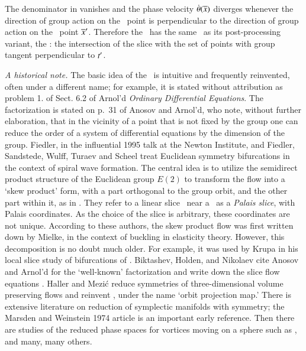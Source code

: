 \documentclass[preprint,number,sort&compress]{elsarticle}
\begin{document}
The denominator in  vanishes and the phase
velocity $\dot{{\bf \theta}}(\overline{x})$ diverges whenever the
direction of group action on the \reducedsp\ point is
perpendicular to the direction of group action on the \slice\
point ${\overline{x}'}$. Therefore the \mslices\ has the same \sset\ as
its post-processing variant, the \mframes: the intersection of
the slice with the set of points with group tangent
perpendicular to $t'_{}$.

\emph{A historical note.}
The basic idea of the \mslices\ is intuitive and
frequently reinvented, often under a different name; for example,
it is stated without attribution as problem 1. of Sect.
6.2 of Arnol'd {\em Ordinary Differential
Equations}. The factorization
 is stated on p.~31 of Anosov and
Arnol'd, who note, without further elaboration,
that in the vicinity of a point that is not fixed by the
group one can reduce the order of a system of differential
equations by the dimension of the group.
Fiedler, in the influential 1995 talk
at the Newton Institute, and Fiedler, Sandstede, Wulff,
Turaev and  Scheel
treat Euclidean symmetry bifurcations in the context of
spiral wave formation. The central idea is to utilize the
semidirect product structure of the Euclidean group $E(2)$ to
transform the flow into a `skew product' form, with a part
orthogonal to the group orbit, and the other part within it,
as in . They refer to a linear slice
\pSRed\ near a \reqv\ as a {\em Palais slice}, with Palais
coordinates. As the choice of the slice is arbitrary, these
coordinates are not unique. According to these authors, the
skew product flow was first written down by
Mielke, in the context of buckling in
elasticity theory. However, this decomposition is no doubt
much older. For example, it was  used by
Krupa in his local slice study of
bifurcations of \reqva. Biktashev, Holden, and
Nikolaev cite Anosov and Arnol'd  for
the `well-known' factorization  and write
down the slice flow equations .
Haller and Mezi\'c reduce symmetries of
three-dimensional volume preserving flows and reinvent
\mframes, under the name `orbit projection map.' There is
extensive literature on reduction of symplectic manifolds
with symmetry; the Marsden and Weinstein 1974 article
is an important early reference. Then there are studies of
the reduced phase spaces for vortices moving on a sphere such
as , and many, many others.
\end{document}
